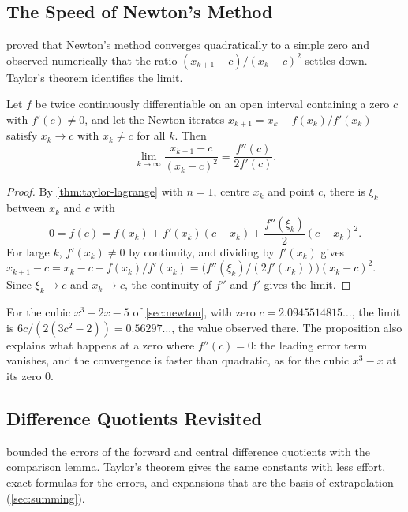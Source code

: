 \subsection{The Speed of Newton's Method}

 proved that Newton's method converges quadratically to a simple zero and observed numerically that the ratio $(x_{k+1}-c)/(x_k-c)^2$ settles down. Taylor's theorem identifies the limit.

\begin{proposition}
\label{prop:newton-ratio}
Let $f$ be twice continuously differentiable on an open interval containing a zero $c$ with $f'(c)\ne0$, and let the Newton iterates $x_{k+1}=x_k-f(x_k)/f'(x_k)$ satisfy $x_k\to c$ with $x_k\ne c$ for all $k$. Then
\[
\lim_{k\to\infty}\frac{x_{k+1}-c}{(x_k-c)^2}=\frac{f''(c)}{2f'(c)} .
\]
\end{proposition}

\begin{proof}
By \cref{thm:taylor-lagrange} with $n=1$, centre $x_k$ and point $c$, there is $\xi_k$ between $x_k$ and $c$ with
\[
0=f(c)=f(x_k)+f'(x_k)(c-x_k)+\frac{f''(\xi_k)}2(c-x_k)^2 .
\]
For large $k$, $f'(x_k)\ne0$ by continuity, and dividing by $f'(x_k)$ gives $x_{k+1}-c=x_k-c-f(x_k)/f'(x_k)=\bigl(f''(\xi_k)/(2f'(x_k))\bigr)(x_k-c)^2$. Since $\xi_k\to c$ and $x_k\to c$, the continuity of $f''$ and $f'$ gives the limit.
\end{proof}

For the cubic $x^3-2x-5$ of \cref{sec:newton}, with zero $c=2.0945514815\ldots$, the limit is $6c/(2(3c^2-2))=0.56297\ldots$, the value observed there. The proposition also explains what happens at a zero where $f''(c)=0$: the leading error term vanishes, and the convergence is faster than quadratic, as for the cubic $x^3-x$ at its zero $0$.

\subsection{Difference Quotients Revisited}

 bounded the errors of the forward and central difference quotients with the comparison lemma. Taylor's theorem gives the same constants with less effort, exact formulas for the errors, and expansions that are the basis of extrapolation (\cref{sec:summing}).

